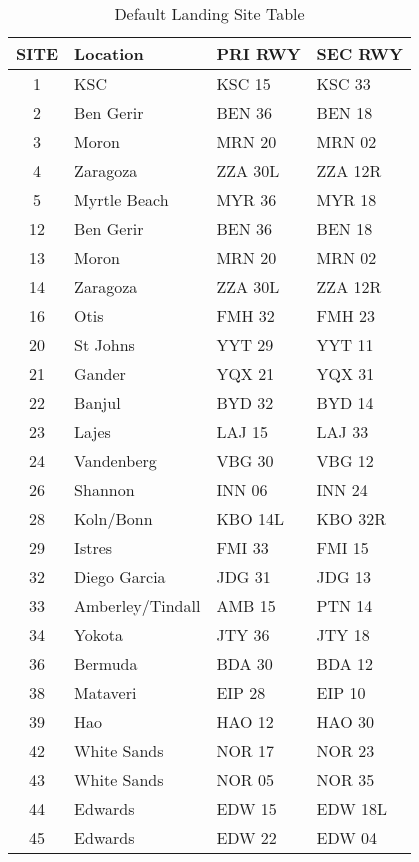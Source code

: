 \documentclass[Space_Shuttle_Vessel_Manual.tex]{subfiles}
\begin{document}
\begin{multicols*}{2}
\begin{table}[H]
  \centering
  \begin{tabularx}{225pt}{c | >{\centering\arraybackslash}p{70pt} | >{\centering\arraybackslash}p{45pt} | >{\centering\arraybackslash}p{45pt}}
    \textbf{SITE} & \textbf{Location} & \textbf{PRI RWY} & \textbf{SEC RWY} \\
    \hline
    1 & KSC & KSC 15 & KSC 33 \\
    2 & Ben Gerir & BEN 36 & BEN 18 \\
    3 & Moron & MRN 20 & MRN 02 \\
    4 & Zaragoza & ZZA 30L & ZZA 12R \\
    5 & Myrtle Beach & MYR 36 & MYR 18 \\
    12 & Ben Gerir & BEN 36 & BEN 18 \\
    13 & Moron & MRN 20 & MRN 02 \\
    14 & Zaragoza & ZZA 30L & ZZA 12R \\
    16 & Otis & FMH 32 & FMH 23 \\
    20 & St Johns & YYT 29 & YYT 11 \\
    21 & Gander & YQX 21 & YQX 31 \\
    22 & Banjul & BYD 32 & BYD 14 \\
    23 & Lajes & LAJ 15 & LAJ 33 \\
    24 & Vandenberg & VBG 30 & VBG 12 \\
    26 & Shannon & INN 06 & INN 24 \\
    28 & Koln/Bonn & KBO 14L & KBO 32R \\
    29 & Istres & FMI 33 & FMI 15 \\
    32 & Diego Garcia & JDG 31 & JDG 13 \\
    33 & Amberley/Tindall & AMB 15 & PTN 14 \\
    34 & Yokota & JTY 36 & JTY 18 \\
    36 & Bermuda & BDA 30 & BDA 12 \\
    38 & Mataveri & EIP 28 & EIP 10 \\
    39 & Hao & HAO 12 & HAO 30 \\
    42 & White Sands & NOR 17 & NOR 23 \\
    43 & White Sands & NOR 05 & NOR 35 \\
    44 & Edwards & EDW 15 & EDW 18L \\
    45 & Edwards & EDW 22 & EDW 04
  \end{tabularx}
  \caption{Default Landing Site Table}
  \label{tab:LandingSites}
\end{table}
\end{multicols*}
\end{document}
